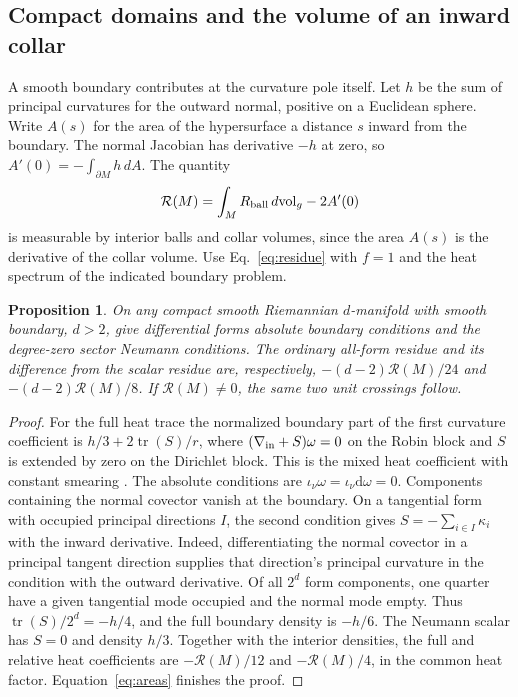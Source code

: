 \documentclass[aps,prd,reprint,onecolumn,nofootinbib,amsmath,amssymb]{revtex4-2}
\newtheorem{proposition}{Proposition}
\newcommand{\dv}{\,d\mathrm{vol}_g}
\begin{document}
\subsection{Compact domains and the volume of an inward collar}

A smooth boundary contributes at the curvature pole itself. Let \(h\)
be the sum of principal curvatures for the outward normal, positive on
a Euclidean sphere. Write \(A(s)\) for the area of the hypersurface a
distance \(s\) inward from the boundary. The normal Jacobian has derivative
\(-h\) at zero, so \(A'(0)=-\int_{\partial M}h\,dA\). The quantity
\begin{equation}
 \mathcal R(M)=\int_M R_{\rm ball}\dv-2A'(0)
 \label{eq:collar}
\end{equation}
is measurable by interior balls and collar volumes, since the area
\(A(s)\) is the derivative of the collar volume. Use Eq.~\eqref{eq:residue}
with \(f=1\) and the heat spectrum of the indicated boundary problem.

\begin{proposition}\label{prop:boundary}
On any compact smooth Riemannian \(d\)-manifold with smooth boundary,
\(d>2\), give differential forms absolute boundary conditions and the
degree-zero sector Neumann conditions. The ordinary all-form residue
and its difference from the scalar residue are, respectively,
\(-(d-2)\mathcal R(M)/24\) and \(-(d-2)\mathcal R(M)/8\).
If \(\mathcal R(M)\ne0\), the same two unit crossings follow.
\end{proposition}
\begin{proof}
For the full heat trace the normalized boundary part of the first
curvature coefficient is \(h/3+2\operatorname{tr}(S)/r\), where
\((\nabla_{\rm in}+S)\omega=0\) on the Robin block and \(S\) is
extended by zero on the Dirichlet block. This is the mixed heat
coefficient with constant smearing \cite{BransonMixed1999}.
The absolute conditions are \(\iota_\nu\omega=\iota_\nu\mathrm d\omega=0\).
Components containing the normal covector vanish at the boundary. On a
tangential form with occupied principal directions \(I\), the second
condition gives \(S=-\sum_{i\in I}\kappa_i\) with the inward derivative.
Indeed, differentiating the normal covector in a principal tangent
direction supplies that direction's principal curvature in the condition
with the outward derivative. Of all \(2^d\) form components, one quarter
have a given tangential mode occupied and the normal mode empty.
Thus \(\operatorname{tr}(S)/2^d=-h/4\), and the full boundary density
is \(-h/6\). The Neumann scalar has \(S=0\) and density \(h/3\).
Together with the interior densities, the full and relative heat
coefficients are \(-\mathcal R(M)/12\) and \(-\mathcal R(M)/4\), in the
common heat factor. Equation~\eqref{eq:areas} finishes the proof.
\end{proof}
\end{document}
